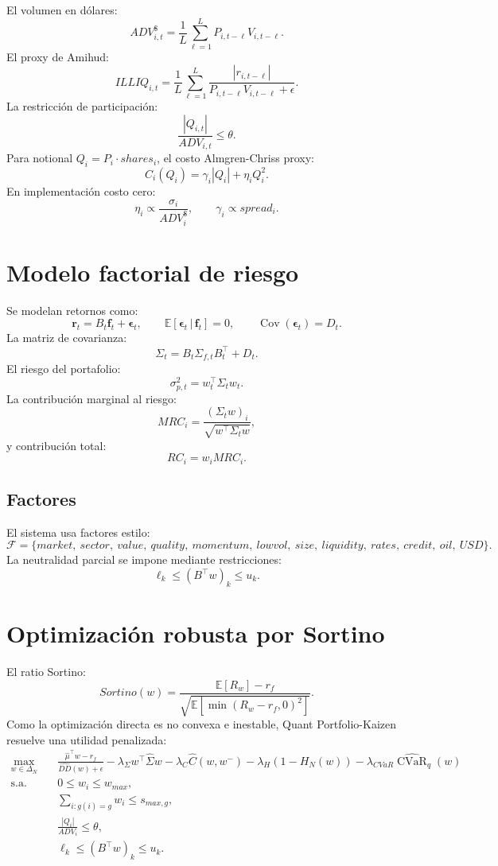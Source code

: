 \documentclass[11pt,letterpaper]{article}
\DeclareMathOperator{\Cov}{Cov}
\DeclareMathOperator{\CVaR}{CVaR}
\newcommand{\E}{\mathbb{E}}
\newcommand{\1}{\mathbf{1}}
\newcommand{\given}{\,|\,}
\begin{document}
El volumen en dólares:
\[
    ADV^\$_{i,t}
    =
    \frac{1}{L}\sum_{\ell=1}^{L}
    P_{i,t-\ell}V_{i,t-\ell}.
\]
El proxy de Amihud:
\[
    ILLIQ_{i,t}
    =
    \frac{1}{L}
    \sum_{\ell=1}^{L}
    \frac{|r_{i,t-\ell}|}{P_{i,t-\ell}V_{i,t-\ell}+\epsilon}.
\]
La restricción de participación:
\[
    \frac{|Q_{i,t}|}{ADV_{i,t}}\le \theta.
\]
Para notional \(Q_i=P_i\cdot shares_i\), el costo Almgren-Chriss proxy:
\[
    C_i(Q_i)
    =
    \gamma_i |Q_i|
    +
    \eta_i Q_i^2.
\]
En implementación costo cero:
\[
    \eta_i \propto \frac{\sigma_i}{ADV^\$_i},
    \qquad
    \gamma_i \propto spread_i.
\]

\newpage
\section{Modelo factorial de riesgo}

Se modelan retornos como:
\[
    \bm r_t
    =
    B_t\bm f_t+\bm\epsilon_t,
    \qquad
    \E[\bm\epsilon_t\given \bm f_t]=0,
    \qquad
    \Cov(\bm\epsilon_t)=D_t.
\]
La matriz de covarianza:
\[
    \Sigma_t
    =
    B_t\Sigma_{f,t}B_t^\top + D_t.
\]
El riesgo del portafolio:
\[
    \sigma_{p,t}^2
    =
    w_t^\top \Sigma_t w_t.
\]
La contribución marginal al riesgo:
\[
    MRC_i
    =
    \frac{(\Sigma_t w)_i}{\sqrt{w^\top\Sigma_t w}},
\]
y contribución total:
\[
    RC_i=w_iMRC_i.
\]

\subsection{Factores}

El sistema usa factores estilo:
\[
    \mathcal{F}
    =
    \{
    market,\ sector,\ value,\ quality,\ momentum,\ lowvol,\ size,\ liquidity,\ rates,\ credit,\ oil,\ USD
    \}.
\]
La neutralidad parcial se impone mediante restricciones:
\[
    \ell_k \le (B^\top w)_k \le u_k.
\]

\newpage
\section{Optimización robusta por Sortino}

El ratio Sortino:
\[
    Sortino(w)
    =
    \frac{\E[R_w]-r_f}
    {\sqrt{\E[\min(R_w-r_f,0)^2]}}.
\]
Como la optimización directa es no convexa e inestable, Quant Portfolio-Kaizen resuelve una utilidad penalizada:
\[
\begin{aligned}
    \max_{w\in\Delta_N}\quad
    &
    \frac{\hat\mu^\top w-r_f}{\widehat{DD}(w)+\epsilon}
    -
    \lambda_\Sigma w^\top \hat\Sigma w
    -
    \lambda_C \widehat{C}(w,w^-)
    -
    \lambda_H(1-H_N(w))
    -
    \lambda_{CVaR}\widehat{\CVaR}_q(w)
    \\
    \text{s.a.}\quad
    &
    0\le w_i\le w_{max},
    \\
    &
    \sum_{i:g(i)=g}w_i\le s_{max,g},
    \\
    &
    \frac{|Q_i|}{ADV_i}\le\theta,
    \\
    &
    \ell_k\le (B^\top w)_k\le u_k.
\end{aligned}
\]
\end{document}
